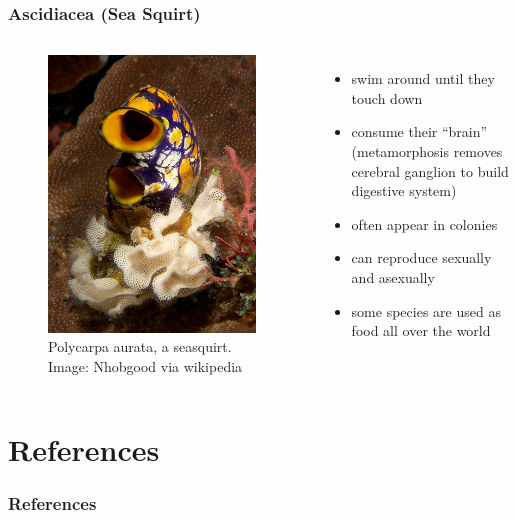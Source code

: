 \documentclass{beamer}
\begin{document}
\begin{frame}
    \frametitle{Ascidiacea (Sea Squirt)}
    \begin{columns}
            \centering
            \begin{figure}
                \includegraphics[width=0.95\textwidth]{report-images/Polycarpa_aurata.jpg}
                \caption{Polycarpa aurata, a seasquirt. Image: Nhobgood via wikipedia}
            \end{figure}
            \begin{itemize}
                \item swim around until they touch down
                \item consume their ``brain'' (metamorphosis removes cerebral ganglion to build digestive system)
                \item often appear in colonies
                \item can reproduce sexually and asexually
                \item some species are used as food all over the world
            \end{itemize}
    \end{columns}
\end{frame}


\section{References}

\begin{frame}
    \frametitle{References}
    
\end{frame}
\end{document}
